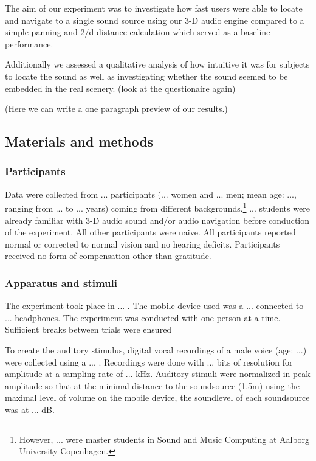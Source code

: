 \documentclass[journal]{IEEEtran}
\begin{document}
The aim of our experiment was to investigate how fast users were able to locate and navigate to a single sound source using our 3-D audio engine compared to a simple panning and 2/d distance calculation which served as a baseline performance. 

Additionally we assessed a qualitative analysis of how intuitive it was for subjects to locate the sound as well as investigating whether the sound seemed to be embedded in the real scenery. (look at the questionaire again)

(Here we can write a one paragraph preview of our results.)
\subsection{Materials and methods}
\subsubsection{Participants}
Data were collected from ... participants (... women and ... men; mean age: ..., ranging from ... to ... years) coming from different backgrounds.\footnote{However, ... were master students in Sound and Music Computing at Aalborg University Copenhagen.} ... students were already familiar with 3-D audio sound and/or audio navigation before conduction of the experiment. All other participants were naive. All participants reported normal or corrected to normal vision and no hearing deficits. Participants received no form of compensation other than gratitude. 

\subsubsection{Apparatus and stimuli}
The experiment took place in ... . The mobile device used was a ... connected to ... headphones. The experiment was conducted with one person at a time. Sufficient breaks between trials were ensured 

To create the auditory stimulus, digital vocal recordings of a male voice (age: ...) were collected using a ... . Recordings were done with ... bits of resolution for amplitude at a sampling rate of ...  kHz. Auditory stimuli were normalized in peak amplitude so that at the minimal distance to the soundsource (1.5m) using the maximal level of volume on the mobile device, the soundlevel of each soundsource was at ... dB. 
\end{document}
